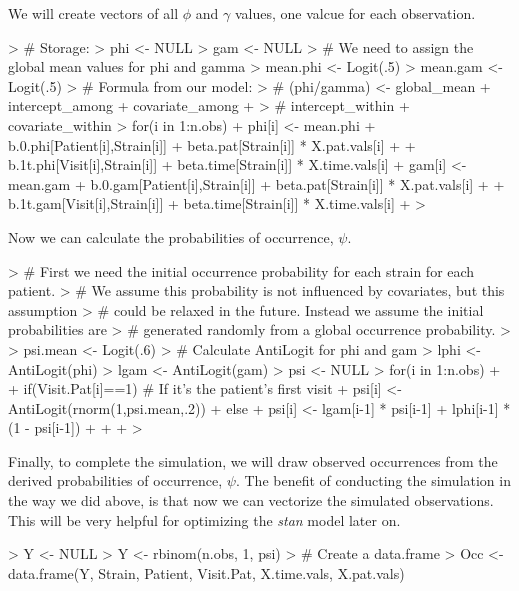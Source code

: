 \documentclass{article}
\begin{document}
We will create vectors of all $\phi$ and $\gamma$ values, one valcue for each observation. 
\begin{Schunk}
\begin{Sinput}
> # Storage:
> phi <- NULL
> gam <- NULL
> # We need to assign the global mean values for phi and gamma
> mean.phi <- Logit(.5)
> mean.gam <- Logit(.5)
> # Formula from our model:
> # (phi/gamma) <- global_mean + intercept_among + covariate_among + 
> #                     intercept_within + covariate_within
> for(i in 1:n.obs){
+   phi[i] <- mean.phi + b.0.phi[Patient[i],Strain[i]] + beta.pat[Strain[i]] * X.pat.vals[i] + 
+                 b.1t.phi[Visit[i],Strain[i]] + beta.time[Strain[i]] * X.time.vals[i]
+   gam[i] <- mean.gam + b.0.gam[Patient[i],Strain[i]] + beta.pat[Strain[i]] * X.pat.vals[i] + 
+                 b.1t.gam[Visit[i],Strain[i]] + beta.time[Strain[i]] * X.time.vals[i]
+ }
> 
\end{Sinput}
\end{Schunk}

Now we can calculate the probabilities of occurrence, $\psi$.
\begin{Schunk}
\begin{Sinput}
> # First we need the initial occurrence probability for each strain for each patient.
> # We assume this probability is not influenced by covariates, but this assumption
> # could be relaxed in the future. Instead we assume the initial probabilities are
> # generated randomly from a global occurrence probability.
> 
> psi.mean <- Logit(.6)
> # Calculate AntiLogit for phi and gam
> lphi <- AntiLogit(phi)
> lgam <- AntiLogit(gam)
> psi <- NULL
> for(i in 1:n.obs){
+   
+   if(Visit.Pat[i]==1){ # If it's the patient's first visit
+     psi[i] <- AntiLogit(rnorm(1,psi.mean,.2))
+   }else{
+     psi[i] <- lgam[i-1] * psi[i-1] + lphi[i-1] * (1 - psi[i-1]) 
+   }
+   
+ }
> 
\end{Sinput}
\end{Schunk}

Finally, to complete the simulation, we will draw observed occurrences from the derived probabilities of occurrence, $\psi$. The benefit of conducting the simulation in the way we did above, is that now we can vectorize the simulated observations. This will be very helpful for optimizing the \emph{stan} model later on.
\begin{Schunk}
\begin{Sinput}
> Y <- NULL
> Y <- rbinom(n.obs, 1, psi)
> # Create a data.frame
> Occ <- data.frame(Y, Strain, Patient, Visit.Pat, X.time.vals, X.pat.vals)
\end{Sinput}
\end{Schunk}
\end{document}
